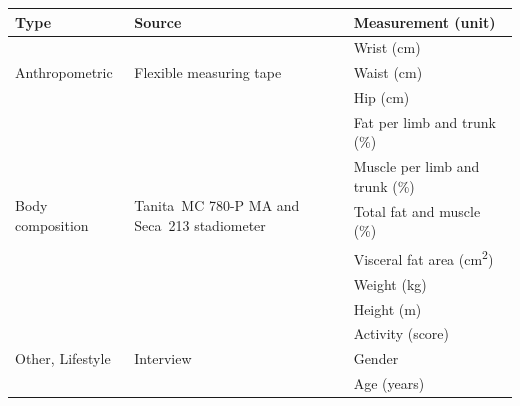 \begin{table}[h]
	\centering
	\begin{tabular}{ l l l }
		\toprule
		Type                               & Source                                                                                         & Measurement (unit)                        \\
		\midrule
		\multirow{3}{*}{Anthropometric}    & \multirow{3}{4cm}{Flexible measuring tape}                                                     & Wrist (cm)                                \\
		                                   &                                                                                                & Waist (cm)                                \\
		                                   &                                                                                                & Hip (cm)                                  \\
		\midrule

		\multirow{6}{*}{Body composition}  & \multirow{6}{4cm}{Tanita\textregistered\ MC 780-P MA and Seca\textregistered\ 213 stadiometer} & Fat per limb and trunk (\%)               \\
		                                   &                                                                                                & Muscle per limb and trunk (\%)            \\
		                                   &                                                                                                & Total fat and muscle (\%)                 \\
		                                   &                                                                                                & Visceral fat area (cm\textsuperscript{2}) \\
		                                   &                                                                                                & Weight (kg)                               \\
		                                   &                                                                                                & Height (m)                                \\
		\midrule

		\multirow{3}{*}{Other, Lifestyle}  & \multirow{3}{4cm}{Interview}                                                                   & Activity   (score)                        \\
		                                   &                                                                                                & Gender                                    \\
		                                   &                                                                                                & Age (years)                               \\


\end{tabular}
\end{table}
